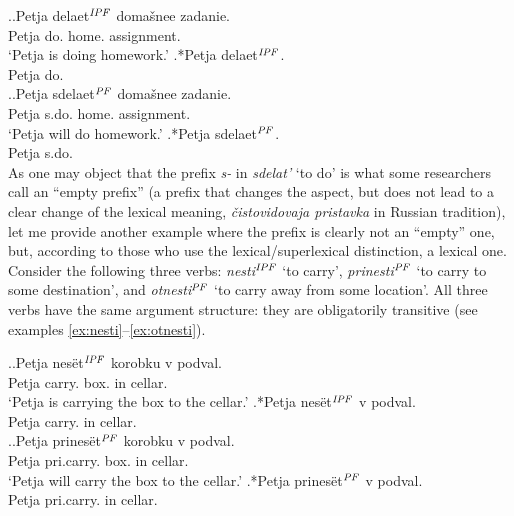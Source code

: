 \ex.\label{ex:delat}\ag.Petja delaet$^{\mathit{IPF}}$ doma\v{s}nee zadanie.\\
Petja do. home. assignment.\\
\vspace{0.5em}
`Petja is doing homework.'
\bg.*Petja delaet$^{\mathit{IPF}}$.\\
Petja do.\\

\ex.\label{ex:sdelat}\ag.Petja sdelaet$^{\mathit{PF}}$ doma\v{s}nee zadanie.\\
Petja s.do. home. assignment.\\
\vspace{0.5em}
`Petja will do homework.'
\bg.*Petja sdelaet$^{\mathit{PF}}$.\\
Petja s.do.\\


As one may object that the prefix \textit{s-} in \textit{sdelat'} `to do' is what some researchers call an ``empty prefix'' (a prefix that changes the aspect, but does not lead to a clear change of the lexical meaning, \textit{\v{c}istovidovaja pristavka} in Russian tradition), let me provide another example where the prefix is clearly not an ``empty'' one, but, according to those who use the lexical/superlexical distinction, a lexical one.  Consider the following three verbs: \textit{nesti$^{\mathit{IPF}}$} `to carry', \textit{prinesti$^{\mathit{PF}}$} `to carry to some destination',  and \textit{otnesti$^{\mathit{PF}}$} `to carry away from some location'. All three verbs have the same argument structure: they are obligatorily transitive (see examples \ref{ex:nesti}--\ref{ex:otnesti}).

\ex.\label{ex:nesti}\ag.Petja nes\"{e}t$^{\mathit{IPF}}$ korobku v podval.\\
Petja carry. box. in cellar.\\
\vspace{0.5em}
`Petja is carrying the box to the cellar.'
\bg.*Petja nes\"{e}t$^{\mathit{IPF}}$ v podval.\\
Petja carry. in cellar.\\

\ex.\label{ex:prinesti}\ag.Petja prines\"{e}t$^{\mathit{PF}}$ korobku v podval.\\
Petja pri.carry. box. in cellar.\\
\vspace{0.5em}
`Petja will carry the box to the cellar.'
\bg.*Petja prines\"{e}t$^{\mathit{PF}}$ v podval.\\
Petja pri.carry. in cellar.\\

